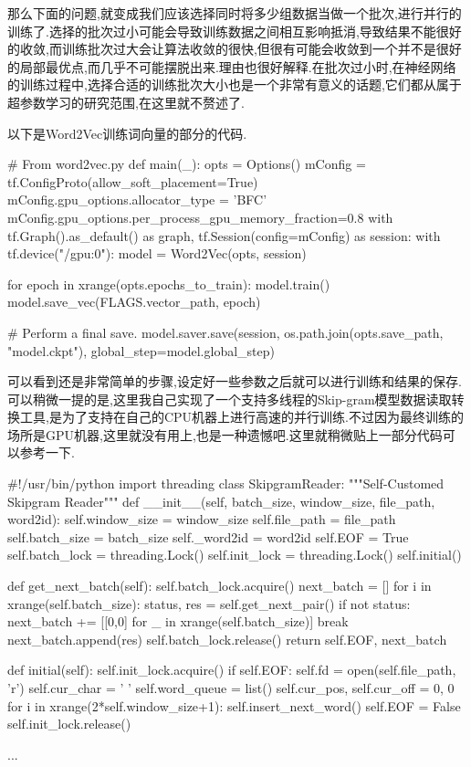 那么下面的问题,就变成我们应该选择同时将多少组数据当做一个批次,进行并行的训练了.选择的批次过小可能会导致训练数据之间相互影响抵消,导致结果不能很好的收敛,而训练批次过大会让算法收敛的很快,但很有可能会收敛到一个并不是很好的局部最优点,而几乎不可能摆脱出来.理由也很好解释.在批次过小时,在神经网络的训练过程中,选择合适的训练批次大小也是一个非常有意义的话题,它们都从属于超参数学习的研究范围,在这里就不赘述了.


以下是Word2Vec训练词向量的部分的代码.

\begin{python}
# From word2vec.py
def main(_):
    opts = Options()
    mConfig = tf.ConfigProto(allow_soft_placement=True)
    mConfig.gpu_options.allocator_type = 'BFC'
    mConfig.gpu_options.per_process_gpu_memory_fraction=0.8
    with tf.Graph().as_default() as graph, tf.Session(config=mConfig) as session:
        with tf.device("/gpu:0"):
            model = Word2Vec(opts, session)

        for epoch in xrange(opts.epochs_to_train):
            model.train()                              
            model.save_vec(FLAGS.vector_path, epoch) 

        # Perform a final save.
        model.saver.save(session,
                os.path.join(opts.save_path, "model.ckpt"),
                global_step=model.global_step)      
    
\end{python}

可以看到还是非常简单的步骤,设定好一些参数之后就可以进行训练和结果的保存.可以稍微一提的是,这里我自己实现了一个支持多线程的Skip-gram模型数据读取转换工具,是为了支持在自己的CPU机器上进行高速的并行训练.不过因为最终训练的场所是GPU机器,这里就没有用上,也是一种遗憾吧.这里就稍微贴上一部分代码可以参考一下.

\begin{python}
#!/usr/bin/python
import threading
class SkipgramReader:
    """Self-Customed Skipgram Reader"""
    def __init__(self, batch_size, window_size, file_path, word2id):
        self.window_size = window_size
        self.file_path = file_path
        self.batch_size = batch_size
        self._word2id = word2id
        self.EOF = True
        self.batch_lock = threading.Lock()
        self.init_lock = threading.Lock()
        self.initial()

    def get_next_batch(self):
        self.batch_lock.acquire()
        next_batch = []
        for i in xrange(self.batch_size):
            status, res = self.get_next_pair()
            if not status:
                next_batch += [[0,0] for _ in xrange(self.batch_size)]
                break
            next_batch.append(res)           
        self.batch_lock.release()
        return self.EOF, next_batch

    def initial(self):
        self.init_lock.acquire()
        if self.EOF:
            self.fd = open(self.file_path, 'r')
            self.cur_char = ' '
            self.word_queue = list()
            self.cur_pos, self.cur_off = 0, 0            
            for i in xrange(2*self.window_size+1):
                self.insert_next_word()
            self.EOF = False
        self.init_lock.release() 
   
   ...
\end{python}

